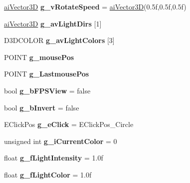 \begin{DoxyCompactItemize}
\item 
\hypertarget{namespace_assimp_view_a57c8925fb678c4860d726a66fdafc6b6}{\hyperlink{structai_vector3_d}{ai\+Vector3\+D} {\bfseries g\+\_\+v\+Rotate\+Speed} = \hyperlink{structai_vector3_d}{ai\+Vector3\+D}(0.\+5f,0.\+5f,0.\+5f)}\label{namespace_assimp_view_a57c8925fb678c4860d726a66fdafc6b6}

\item 
\hyperlink{structai_vector3_d}{ai\+Vector3\+D} {\bfseries g\+\_\+av\+Light\+Dirs} \mbox{[}1\mbox{]}
\item 
D3\+D\+C\+O\+L\+O\+R {\bfseries g\+\_\+av\+Light\+Colors} \mbox{[}3\mbox{]}
\item 
\hypertarget{namespace_assimp_view_ac8717bfea02c8742e8114c5c881075a0}{P\+O\+I\+N\+T {\bfseries g\+\_\+mouse\+Pos}}\label{namespace_assimp_view_ac8717bfea02c8742e8114c5c881075a0}

\item 
\hypertarget{namespace_assimp_view_a88f5b82662ff64ff17e42508d4537234}{P\+O\+I\+N\+T {\bfseries g\+\_\+\+Lastmouse\+Pos}}\label{namespace_assimp_view_a88f5b82662ff64ff17e42508d4537234}

\item 
\hypertarget{namespace_assimp_view_a0a4febab4d4db0b7900afe00f5bd5cc8}{bool {\bfseries g\+\_\+b\+F\+P\+S\+View} = false}\label{namespace_assimp_view_a0a4febab4d4db0b7900afe00f5bd5cc8}

\item 
\hypertarget{namespace_assimp_view_a96a748bf69b20f0a1a1f90a94ffb0da6}{bool {\bfseries g\+\_\+b\+Invert} = false}\label{namespace_assimp_view_a96a748bf69b20f0a1a1f90a94ffb0da6}

\item 
\hypertarget{namespace_assimp_view_ad16ed2532d62fa4bf997be21d8e25319}{E\+Click\+Pos {\bfseries g\+\_\+e\+Click} = E\+Click\+Pos\+\_\+\+Circle}\label{namespace_assimp_view_ad16ed2532d62fa4bf997be21d8e25319}

\item 
\hypertarget{namespace_assimp_view_a64120866283a7387037d11ffef980f2a}{unsigned int {\bfseries g\+\_\+i\+Current\+Color} = 0}\label{namespace_assimp_view_a64120866283a7387037d11ffef980f2a}

\item 
\hypertarget{namespace_assimp_view_a5aa0ae9b412ff1ad7bc12b8e2a09768e}{float {\bfseries g\+\_\+f\+Light\+Intensity} = 1.\+0f}\label{namespace_assimp_view_a5aa0ae9b412ff1ad7bc12b8e2a09768e}

\item 
\hypertarget{namespace_assimp_view_a7ca8e56b5001b88983590c932e61dc29}{float {\bfseries g\+\_\+f\+Light\+Color} = 1.\+0f}\label{namespace_assimp_view_a7ca8e56b5001b88983590c932e61dc29}


\end{DoxyCompactItemize}
